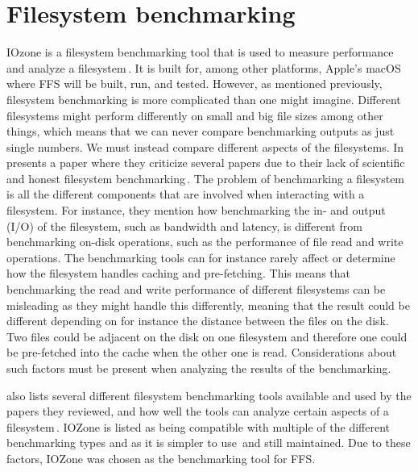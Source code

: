 \section{Filesystem benchmarking}
\label{sec:iozone}
IOzone is a filesystem benchmarking tool that is used to measure performance and analyze a filesystem\,\cite{IozoneFilesystemBenchmark}. It is built for, among other platforms, Apple's macOS where FFS will be built, run, and tested. However, as mentioned previously, filesystem benchmarking is more complicated than one might imagine. Different filesystems might perform differently on small and big file sizes among other things, which means that we can never compare benchmarking outputs as just single numbers. We must instead compare different aspects of the filesystems. In \citeyear{tarasovBenchmarkingFileSystem2011} \citeauthor{tarasovBenchmarkingFileSystem2011} presents a paper where they criticize several papers due to their lack of scientific and honest filesystem benchmarking\,\cite{tarasovBenchmarkingFileSystem2011}. The problem of benchmarking a filesystem is all the different components that are involved when interacting with a filesystem. For instance, they mention how benchmarking the in- and output (I/O) of the filesystem, such as bandwidth and latency, is different from benchmarking on-disk operations, such as the performance of file read and write operations. The benchmarking tools can for instance rarely affect or determine how the filesystem handles caching and pre-fetching. This means that benchmarking the read and write performance of different filesystems can be misleading as they might handle this differently, meaning that the result could be different depending on for instance the distance between the files on the disk. Two files could be adjacent on the disk on one filesystem and therefore one could be pre-fetched into the cache when the other one is read. Considerations about such factors must be present when analyzing the results of the benchmarking.

\citeauthor{tarasovBenchmarkingFileSystem2011} also lists several different filesystem benchmarking tools available and used by the papers they reviewed, and how well the tools can analyze certain aspects of a filesystem\,\cite{tarasovBenchmarkingFileSystem2011}. IOZone is listed as being compatible with multiple of the different benchmarking types and as it is simpler to use\,\cite{agarwalComparingIOBenchmarks2018} and still maintained. Due to these factors, IOZone was chosen as the benchmarking tool for FFS.